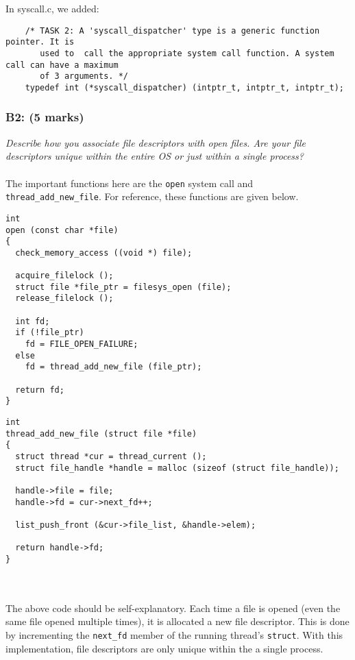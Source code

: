 \documentclass{article}
\begin{document}
In syscall.c, we added:
\begin{lstlisting}
    /* TASK 2: A 'syscall_dispatcher' type is a generic function pointer. It is
       used to  call the appropriate system call function. A system call can have a maximum
       of 3 arguments. */
    typedef int (*syscall_dispatcher) (intptr_t, intptr_t, intptr_t);
\end{lstlisting}



\subsubsection*{B2: (5 marks) }
\textit{Describe how you associate file descriptors with open files. Are your
file descriptors unique within the entire OS or just within a single process? }
\\ \\
The important functions here are the \texttt{open} system call and \texttt{thread\_add\_new\_file}. For reference, these functions are given below.

\begin{minipage}{0.5\textwidth}
\begin{lstlisting}
int
open (const char *file)
{
  check_memory_access ((void *) file);

  acquire_filelock ();
  struct file *file_ptr = filesys_open (file);
  release_filelock ();

  int fd;
  if (!file_ptr)
    fd = FILE_OPEN_FAILURE;
  else
    fd = thread_add_new_file (file_ptr);

  return fd;
}
\end{lstlisting}
\end{minipage}
\begin{minipage}{0.5\textwidth}
\begin{lstlisting}
int
thread_add_new_file (struct file *file)
{
  struct thread *cur = thread_current ();
  struct file_handle *handle = malloc (sizeof (struct file_handle));

  handle->file = file;
  handle->fd = cur->next_fd++;

  list_push_front (&cur->file_list, &handle->elem);

  return handle->fd;
}
\end{lstlisting}
\end{minipage}
\\ \\
The above code should be self-explanatory. Each time a file is opened (even the same file opened multiple times), it is allocated a new file descriptor. This is done by incrementing the \texttt{next\_fd} member of the running thread's \texttt{struct}. With this implementation, file descriptors are only unique within the a single process.
\end{document}
